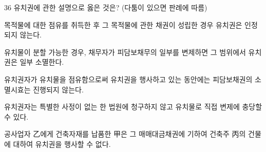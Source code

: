 \begin{question}{36}
유치권에 관한 설명으로 옳은 것은? (다툼이 있으면 판례에 따름)
\begin{choices}
  \item 목적물에 대한 점유를 취득한 후 그 목적물에 관한 채권이 성립한 경우 유치권은 인정되지 않는다.
  \item 유치물이 분할 가능한 경우, 채무자가 피담보채무의 일부를 변제하면 그 범위에서 유치권은 일부 소멸한다.
  \item 유치권자가 유치물을 점유함으로써 유치권을 행사하고 있는 동안에는 피담보채권의 소멸시효는 진행되지 않는다.
  \item 유치권자는 특별한 사정이 없는 한 법원에 청구하지 않고 유치물로 직접 변제에 충당할 수 있다.
  \item 공사업자 乙에게 건축자재를 납품한 甲은 그 매매대금채권에 기하여 건축주 丙의 건물에 대하여 유치권을 행사할 수 없다.
\end{choices}
\end{question}
